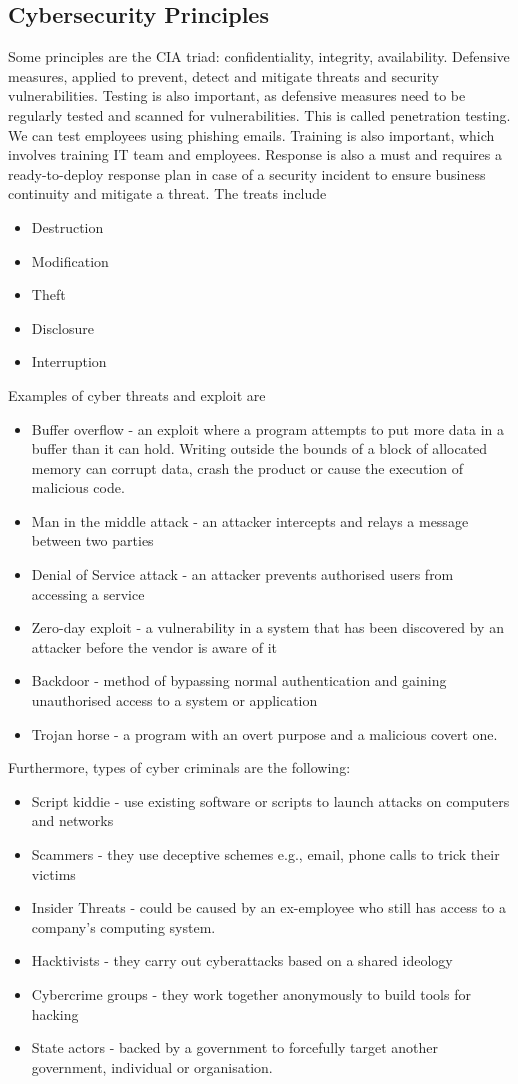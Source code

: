 \documentclass[a4paper]{article}
\theoremstyle{plain}
\theoremstyle{definition}
\theoremstyle{remark}
\begin{document}
	\subsection{Cybersecurity Principles}
	Some principles are the CIA triad: confidentiality, integrity, availability. Defensive measures, applied to prevent, detect and mitigate threats and security vulnerabilities. Testing is also important, as defensive measures need to be regularly tested and scanned for vulnerabilities. This is called penetration testing. We can test employees using phishing emails. Training is also important, which involves training IT team and employees. Response is also a must and requires a ready-to-deploy response plan in case of a security incident to ensure business continuity and mitigate a threat. The treats include
	\begin{itemize}
		\item Destruction
		\item Modification
		\item Theft
		\item Disclosure
		\item Interruption
	\end{itemize}
	Examples of cyber threats and exploit are
	\begin{itemize}
		\item Buffer overflow - an exploit where a program attempts to put more data in a buffer than it can hold. Writing outside the bounds of a block of allocated memory can corrupt data, crash the product or cause the execution of malicious code.
		\item Man in the middle attack - an attacker intercepts and relays a message between two parties
		\item Denial of Service attack - an attacker prevents authorised users from accessing a service
		\item Zero-day exploit - a vulnerability in a system that has been discovered by an attacker before the vendor is aware of it
		\item Backdoor - method of bypassing normal authentication and gaining unauthorised access to a system or application
		\item Trojan horse - a program with an overt purpose and a malicious covert one.
	\end{itemize}
	Furthermore, types of cyber criminals are the following:
	\begin{itemize}
		\item Script kiddie - use existing software or scripts to launch attacks on computers and networks
		\item Scammers - they use deceptive schemes e.g., email, phone calls to trick their victims
		\item Insider Threats - could be caused by an ex-employee who still has access to a company's computing system.
		\item Hacktivists - they carry out cyberattacks based on a shared ideology
		\item Cybercrime groups - they work together anonymously to build tools for hacking
		\item State actors - backed by a government to forcefully target another government, individual or organisation. 
	\end{itemize}
\end{document}
